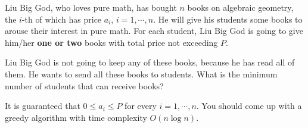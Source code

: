 Liu Big God, who loves pure math, has bought \(n\) books on algebraic geometry, the \(i\)-th of which has price \(a_i\), \(i=1,\cdots,n\). He will give his students some books to arouse their interest in pure math. For each student, Liu Big God is going to give him/her \textbf{one or two} books with total price not exceeding \(P\).

Liu Big God is not going to keep any of these books, because he has read all of them. He wants to send all these books to students. What is the minimum number of students that can receive books?

It is guaranteed that \(0\leqslant a_i\leqslant P\) for every \(i=1,\cdots,n\). You should come up with a greedy algorithm with time complexity \(O(n\log n)\).

